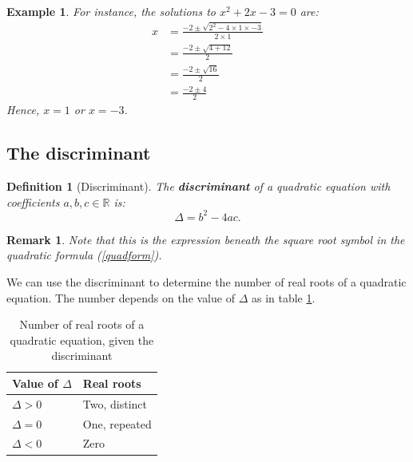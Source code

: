 \documentclass[12pt,a4paper]{article}
\renewcommand{\emph}{\textbf}
\theoremstyle{clearprint}
\newtheorem*{example*}{Example}
\newtheorem*{definition*}{Definition}
\newtheorem*{remark*}{Remark}
\begin{document}
\begin{example*}
For instance, the solutions to \(x^2 + 2x -3 = 0\) are:
\begin{align*}
x &= \frac{-2 \pm \sqrt{2^2-4\times 1 \times -3}}{2 \times 1}\\
&= \frac{-2 \pm \sqrt{4+12}}{2}\\
&= \frac{-2 \pm \sqrt{16}}{2}\\
&= \frac{-2 \pm 4}{2}
\end{align*} 
Hence, \(x = 1\) or \(x = -3\).  
\end{example*}

\subsection{The discriminant}

\begin{definition*}[Discriminant]
The \emph{discriminant} of a quadratic equation with coefficients \(a, b, c \in \mathbb{R}\) is:
\[
\Delta = b^2 - 4ac.
\]
\end{definition*}

\begin{remark*}
Note that this is the expression beneath the square root symbol in the quadratic formula (\ref{quadform}).
\end{remark*}

We can use the discriminant to determine the number of real roots of a quadratic equation. The number depends on the value of \(\Delta\) as in table \ref{Distable}.
\begin{table}[!h]
\begin{center}
\begin{tabular}{|l|l|}
\hline
Value of \(\Delta\) & Real roots \\
\hline
\(\Delta > 0\) & Two, distinct\\
\(\Delta = 0\) & One, repeated\\
\(\Delta < 0\) & Zero\\
\hline
\end{tabular}
\end{center}
\caption{Number of real roots of a quadratic equation, given the discriminant}
\label{Distable}
\end{table}
\end{document}
